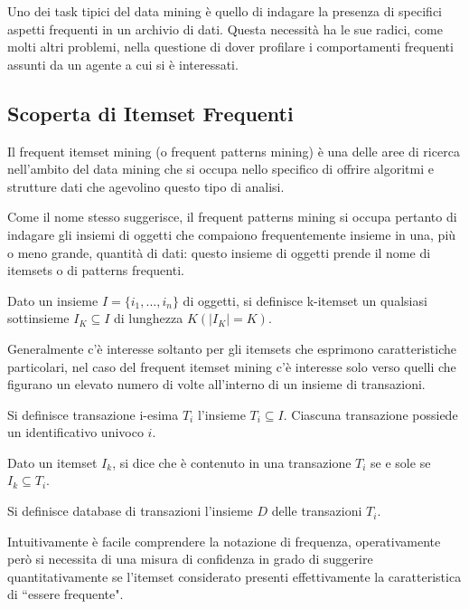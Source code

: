 Uno dei task tipici del data mining {\`e} quello di indagare la presenza di specifici aspetti frequenti in un archivio di dati. Questa necessit{\`a} ha le sue radici, come molti altri problemi, nella questione di dover profilare i comportamenti frequenti assunti da un agente a cui si {\`e} interessati. 

\subsection{Scoperta di Itemset Frequenti}
Il frequent itemset mining (o frequent patterns mining) {\`e} una delle aree di ricerca nell'ambito del data mining che si occupa nello specifico di offrire algoritmi e strutture dati che agevolino questo tipo di analisi.

Come il nome stesso suggerisce, il frequent patterns mining si occupa pertanto di indagare gli insiemi di oggetti che compaiono frequentemente insieme in una, pi{\`u} o meno grande, quantit{\`a} di dati: questo insieme di oggetti prende il nome di itemsets o di patterns frequenti.

\begin{defn}
Dato un insieme $I = \lbrace i_1, ..., i_n \rbrace$ di oggetti, si definisce k-itemset un qualsiasi sottinsieme $I_K \subseteq I$ di lunghezza $K (\lvert I_K \rvert = K)$.
\end{defn}

Generalmente c'{\`e} interesse soltanto per gli itemsets che esprimono caratteristiche particolari, nel caso del frequent itemset mining c'{\`e} interesse solo verso quelli che figurano un elevato numero di volte all'interno di un insieme di transazioni. 

\begin{defn}
Si definisce transazione i-esima \( T_i \) l'insieme $T_i \subseteq I$. Ciascuna transazione possiede un identificativo univoco \( i \).
\end{defn}

\begin{defn}
Dato un itemset \( I_k \), si dice che {\`e} contenuto in una transazione \( T_i \) se e sole se $I_k \subseteq T_i$.
\end{defn}

\begin{defn}
Si definisce database di transazioni l'insieme \( D \) delle transazioni \( T_i \).
\end{defn}

Intuitivamente {\`e} facile comprendere la notazione di frequenza, operativamente per{\`o} si necessita di una misura di confidenza in grado di suggerire quantitativamente se l'itemset considerato presenti effettivamente la caratteristica di ``essere frequente".

